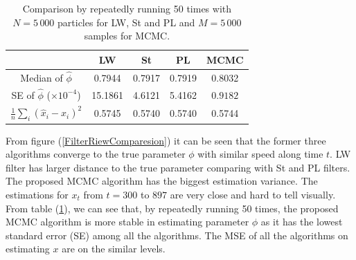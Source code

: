 \begin{table}[]
\centering
\caption{Comparison by repeatedly running 50 times with $N=5\,000$ particles for LW, St and PL and $M=5\,000$ samples for MCMC. }
\label{FilterRiewComparesionTable}
\begin{tabular}{|c|c|c|c|c|}
\hline
     & LW & St & PL  & MCMC\\ \hline
Median of $\hat{\phi}$ &  0.7944  &  0.7917   &  0.7919 & 0.8032 \\ \hline
SE of $\hat{\phi}$ ($\times 10^{-4}$) &  15.1861  &  4.6121 & 5.4162 &  $\mathbf{0.9182}$  \\ \hline
$\frac{1}{n}\sum_i(\hat{x}_i-x_i)^2$ &  0.5745 &  0.5740 &  0.5740 & 0.5744  \\ \hline
\end{tabular}
\end{table}


From figure (\ref{FilterRiewComparesion}) it can be seen that the former three algorithms converge to the true parameter $\phi$ with similar speed along time $t$. LW filter has larger distance to the true parameter comparing with St and PL filters. The proposed MCMC algorithm has the biggest estimation variance. The estimations for $x_t$ from $t=300$ to $897$ are very close and hard to tell visually. From table (\ref{FilterRiewComparesionTable}), we can see that, by repeatedly running 50 times, the proposed MCMC algorithm is more stable in estimating parameter $\phi$ as it has the lowest standard error (SE) among all the algorithms. The MSE of all the algorithms on estimating $x$ are on the similar levels. 


